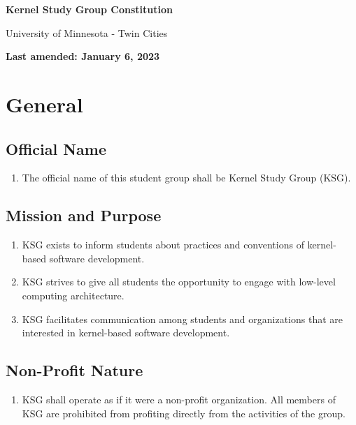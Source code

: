 \documentclass[12pt,executivepaper]{article}
\begin{document}
\begin{center}
    \Large
    \textbf{Kernel Study Group Constitution}

    \smallskip

    \large
    University of Minnesota - Twin Cities

    \smallskip

    \normalsize
    \textbf{Last amended: January 6, 2023}
\end{center}

\section{General}

\subsection{Official Name}
\begin{enumerate}
    \item The official name of this student group shall be Kernel Study Group (KSG).
\end{enumerate}

\subsection{Mission and Purpose}
\begin{enumerate}
    \item KSG exists to inform students about practices and conventions of kernel-based
          software development.
    \item KSG strives to give all students the opportunity to engage with low-level computing
          architecture.
    \item KSG facilitates communication among students and organizations that are interested
          in kernel-based software development.
\end{enumerate}

\subsection{Non-Profit Nature}
\begin{enumerate}
    \item KSG shall operate as if it were a non-profit organization. All members
          of KSG are prohibited from profiting directly from the activities of
          the group.
\end{enumerate}
\end{document}
